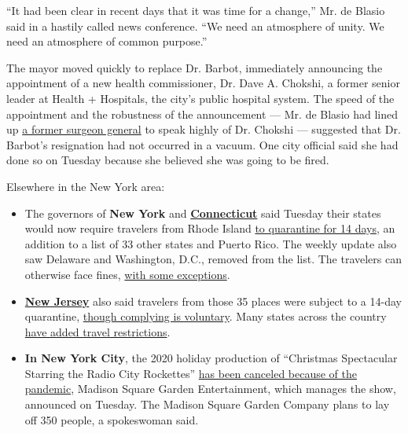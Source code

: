 ``It had been clear in recent days that it was time for a change,'' Mr.
de Blasio said in a hastily called news conference. ``We need an
atmosphere of unity. We need an atmosphere of common purpose.''

The mayor moved quickly to replace Dr. Barbot, immediately announcing
the appointment of a new health commissioner, Dr. Dave A. Chokshi, a
former senior leader at Health + Hospitals, the city's public hospital
system. The speed of the appointment and the robustness of the
announcement --- Mr. de Blasio had lined up
\href{https://wayback.archive-it.org/4765/20170106172109/https:/www.hhs.gov/about/leadership/vadm-vivek-murthy/index.html}{a
former surgeon general} to speak highly of Dr. Chokshi --- suggested
that Dr. Barbot's resignation had not occurred in a vacuum. One city
official said she had done so on Tuesday because she believed she was
going to be fired.

Elsewhere in the New York area:

\begin{itemize}
\item
  The governors of \textbf{New York} and
  \textbf{\href{https://twitter.com/GovNedLamont/status/1290658706003238913}{Connecticut}}
  said Tuesday their states would now require travelers from Rhode
  Island
  \href{https://coronavirus.health.ny.gov/covid-19-travel-advisory}{to
  quarantine for 14 days}, an addition to a list of 33 other states and
  Puerto Rico. The weekly update also saw Delaware and Washington, D.C.,
  removed from the list. The travelers can otherwise face fines,
  \href{https://portal.ct.gov/Coronavirus/Travel}{with some exceptions}.
\item
  \textbf{\href{https://twitter.com/GovMurphy/status/1290656319578484737}{New
  Jersey}} also said travelers from those 35 places were subject to a
  14-day quarantine,
  \href{https://covid19.nj.gov/faqs/nj-information/travel-information/which-states-are-on-the-travel-advisory-list-are-there-travel-restrictions-to-or-from-new-jersey}{though
  complying is voluntary}. Many states across the country
  \href{https://www.nytimes3xbfgragh.onion/2020/07/10/travel/state-travel-restrictions.html?referringSource=articleShare}{have
  added travel restrictions}.
\end{itemize}

\begin{itemize}
\tightlist
\item
  \textbf{In New York City}, the 2020 holiday production of ``Christmas
  Spectacular Starring the Radio City Rockettes''
  \href{https://www.nytimes3xbfgragh.onion/2020/08/04/theater/radio-city-rockettes-christmas-canceled.html}{has
  been canceled because of the pandemic}, Madison Square Garden
  Entertainment, which manages the show, announced on Tuesday. The
  Madison Square Garden Company plans to lay off 350 people, a
  spokeswoman said.
\end{itemize}

